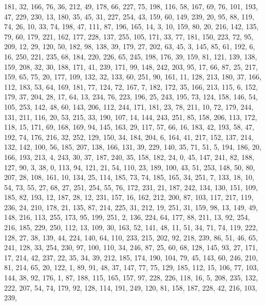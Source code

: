 \begin{DoxyCode}
       181, 32, 166, 76, 36, 212, 49, 178, 66, 227, 75, 198, 116, 58, 167, 69, 76, 101, 193, 47, 229, 230, 13, 180,
       35, 45, 31, 227, 254, 43, 159, 60, 149, 239, 20, 95, 88, 119, 74, 26, 10, 33, 74, 198, 47, 111, 87, 196,
       165, 14, 3, 10, 159, 80, 20, 216, 142, 135, 79, 60, 179, 221, 162, 177, 228, 137, 255, 105, 171, 33, 77, 181,
       150, 223, 72, 95, 209, 12, 29, 120, 50, 182, 98, 138, 39, 179, 27, 202, 63, 45, 3, 145, 85, 61, 192, 6, 16,
       250, 221, 235, 68, 184, 220, 226, 65, 245, 198, 176, 39, 159, 81, 121, 139, 138, 159, 208, 32, 30, 188, 171,
       41, 239, 171, 99, 148, 242, 203, 95, 17, 66, 87, 25, 217, 159, 65, 75, 20, 177, 109, 132, 32, 133, 60, 251,
       90, 161, 11, 128, 213, 180, 37, 166, 112, 183, 53, 64, 169, 181, 77, 124, 72, 167, 7, 182, 172, 35, 166,
       213, 115, 6, 152, 179, 37, 204, 28, 17, 64, 13, 234, 76, 223, 196, 25, 243, 195, 73, 124, 158, 146, 54, 105,
       253, 142, 48, 60, 143, 206, 112, 244, 171, 181, 23, 78, 211, 10, 72, 179, 244, 131, 211, 116, 20, 53, 215,
       33, 190, 107, 14, 144, 243, 251, 85, 158, 206, 113, 172, 118, 15, 171, 69, 168, 169, 94, 145, 163, 29, 117,
       57, 66, 16, 183, 42, 193, 58, 47, 192, 74, 176, 216, 32, 252, 129, 150, 34, 184, 204, 6, 164, 41, 217, 152,
       137, 214, 132, 142, 100, 56, 185, 207, 138, 166, 131, 39, 229, 140, 35, 71, 51, 5, 194, 186, 20, 166, 193,
       213, 4, 243, 30, 37, 187, 240, 35, 158, 182, 24, 0, 45, 147, 241, 82, 188, 127, 90, 3, 38, 0, 113, 94, 121, 21,
       54, 110, 23, 189, 100, 43, 51, 253, 148, 50, 80, 207, 28, 108, 161, 10, 134, 25, 114, 185, 73, 74, 185,
       165, 34, 251, 7, 133, 18, 10, 54, 73, 55, 27, 68, 27, 251, 254, 55, 76, 172, 231, 21, 187, 242, 134, 130, 151,
       109, 185, 82, 193, 12, 187, 28, 12, 231, 157, 16, 162, 212, 200, 87, 103, 117, 217, 119, 236, 24, 210, 178,
       21, 135, 87, 214, 225, 31, 212, 19, 251, 31, 159, 98, 13, 149, 49, 148, 216, 113, 255, 173, 95, 199, 251, 2,
       136, 224, 64, 177, 88, 211, 13, 92, 254, 216, 185, 229, 250, 112, 13, 109, 30, 163, 52, 141, 48, 11, 51,
       34, 71, 74, 119, 222, 128, 27, 38, 139, 44, 224, 140, 64, 110, 233, 215, 202, 92, 218, 239, 86, 51, 46, 65,
       241, 128, 33, 254, 230, 97, 100, 110, 34, 246, 87, 25, 60, 68, 128, 145, 93, 27, 171, 17, 214, 42, 237, 22,
       35, 34, 39, 212, 185, 174, 190, 104, 79, 45, 143, 60, 246, 210, 81, 214, 65, 20, 122, 1, 89, 91, 48, 37, 147,
       77, 75, 129, 185, 112, 15, 106, 77, 103, 144, 38, 92, 176, 1, 87, 188, 115, 165, 157, 97, 228, 226, 118, 16,
       5, 208, 235, 132, 222, 207, 54, 74, 179, 92, 128, 114, 191, 249, 120, 81, 158, 187, 228, 42, 216, 103, 239,

\end{DoxyCode}
